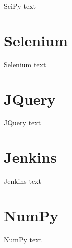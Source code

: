 SciPy text

\section{Selenium}

Selenium text

\section{JQuery}

JQuery text

\section{Jenkins}

Jenkins text


\section{NumPy}

NumPy text